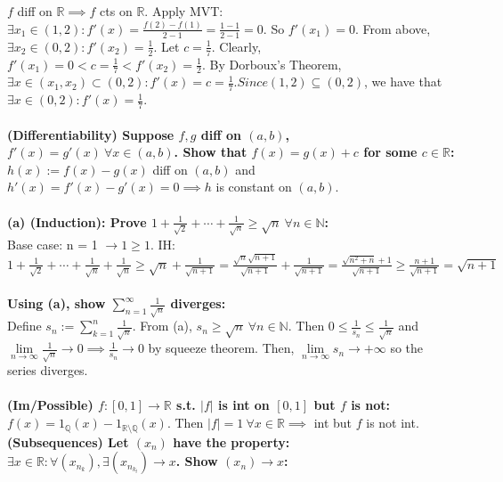 \documentclass{letter}
\begin{document}
$f$ diff on $\mathbb{R} \implies f$ cts on $\mathbb{R}$. Apply MVT:
$\exists x_1 \in (1, 2) : f'(x) = \frac{f(2) - f(1)}{2 - 1} = \frac{1
  - 1}{2 - 1} = 0$. So $f'(x_1) = 0$. From above, $\exists x_2 \in (0,
2) : f'(x_2) = \frac{1}{2}$. Let $c = \frac{1}{7}$. Clearly, $f'(x_1)
= 0 < c = \frac{1}{7} < f'(x_2) = \frac{1}{2}$. By Dorboux's Theorem,
$\exists x \in (x_1, x_2) \subset (0, 2) : f'(x) = c =
\frac{1}{7}. Since (1, 2) \subseteq (0, 2)$, we have that $\exists x
\in (0, 2) : f'(x) = \frac{1}{7}$. \\ \\
\textbf{(Differentiability) Suppose $f, g$ diff on $(a, b)$, $f'(x) =
  g'(x) \ \forall x \in (a, b)$. Show that $f(x) = g(x) + c$ for some
  $c \in \mathbb{R}$:} \\ 
$h(x) := f(x) - g(x)$ diff on $(a, b)$ and $h'(x) = f'(x) - g'(x) = 0
\implies h$ is constant on $(a, b)$. \\ \\
\textbf{(a) (Induction): Prove $1 + \frac{1}{\sqrt{2}} + \cdots +
  \frac{1}{\sqrt{n}} \geq \sqrt{n} \ \forall n \in \mathbb{N}$:} \\
Base case: n = 1 $\rightarrow 1 \geq 1$. IH:
$1 + \frac{1}{\sqrt{2}} + \cdots + \frac{1}{\sqrt{n}} + \frac{1}{\sqrt{n}}
\geq \sqrt{n} + \frac{1}{\sqrt{n + 1}} = \frac{\sqrt{n}\sqrt{n +
    1}}{\sqrt{n + 1}} + \frac{1}{\sqrt{n + 1}}
= \frac{\sqrt{n^2 + n} + 1}{\sqrt{n + 1}}
\geq \frac{n + 1}{\sqrt{n + 1}} = \sqrt{n + 1}$ \\ \\
\textbf{Using (a), show $\sum\limits_{n = 1}^{\infty}
  \frac{1}{\sqrt{n}}$ diverges:} \\
Define $s_n := \sum\limits_{k = 1}^{n} \frac{1}{\sqrt{n}}$. From (a),
$s_n \geq \sqrt{n} \ \forall n \in \mathbb{N}$. Then $0 \leq
\frac{1}{s_n} \leq \frac{1}{\sqrt{n}}$ and $\lim\limits_{n \to \infty}
\frac{1}{\sqrt{n}} \to 0 \implies \frac{1}{s_n} \to 0$ by squeeze
theorem. Then, $\lim\limits_{n \to \infty} s_n \to +\infty$ so the
series diverges. \\ \\
\textbf{(Im/Possible) $f : [0, 1] \to \mathbb{R}$ s.t. $|f|$ is int on
  $[0, 1]$ but $f$ is not:} \\
$f(x) = 1_{\mathbb{Q}}(x) - 1_{\mathbb{R} \setminus
  \mathbb{Q}}(x)$. Then $|f| = 1 \ \forall x \in \mathbb{R} \implies$
int but $f$ is not int. 
\newpage
\textbf{(Subsequences) Let $(x_n)$ have the property: $\exists x \in
  \mathbb{R} : \forall (x_{n_k}), \exists (x_{n_{k_l}}) \to x$. Show
  $(x_n) \to x$:} \\
\end{document}
